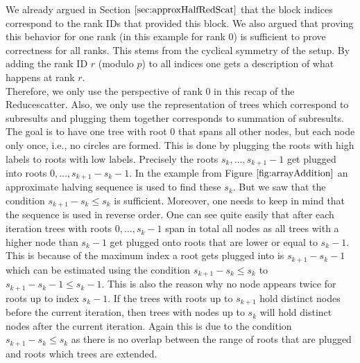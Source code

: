 We already argued in Section $\ref{sec:approxHalfRedScat}$ that the block indices correspond to the rank IDs that provided this block. We also argued that proving this behavior for one rank (in this example for rank 0) is sufficient to prove correctness for all ranks. This stems from the cyclical symmetry of the setup. By adding the rank ID $r$ (modulo $p$) to all indices one gets a description of what happens at rank $r$.\\
Therefore, we only use the perspective of rank 0 in this recap of the Reducescatter. Also, we only use the representation of trees which correspond to subresults and plugging them together corresponds to summation of subresults. The goal is to have one tree with root 0 that spans all other nodes, but each node only once, i.e., no circles are formed. This is done by plugging the roots with high labels to roots with low labels. Precisely the roots $s_k, \dots, s_{k+1}-1$ get plugged into roots $0, \dots, s_{k+1}-s_k-1$. In the example from Figure $\ref{fig:arrayAddition}$ an approximate halving sequence is used to find these $s_k$. But we saw that the condition $s_{k+1}-s_k \leq s_k$ is sufficient. Moreover, one needs to keep in mind that the sequence is used in reverse order. One can see quite easily that after each iteration trees with roots $0,\dots, s_k-1$ span in total all nodes as all trees with a higher node than $s_k-1$ get plugged onto roots that are lower or equal to $s_k-1$. This is because of the maximum index a root gets plugged into is $s_{k+1}-s_k-1$ which can be estimated using the condition $s_{k+1}-s_k \leq s_k$ to  $s_{k+1}-s_k-1\leq s_k-1$. This is also the reason why no node appears twice for roots up to index $s_k-1$. If the trees with roots up to $s_{k+1}$ hold distinct nodes before the current iteration, then trees with nodes up to $s_k$ will hold distinct nodes after the current iteration. Again this is due to the condition $s_{k+1}-s_k \leq s_k$  as there is no overlap between the range of roots that are plugged and roots which trees are extended. 

